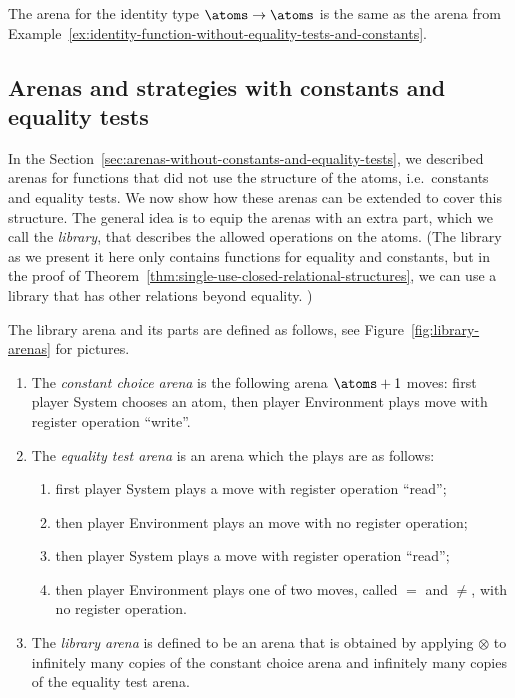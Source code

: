  

\begin{example}
    The arena for the identity type $\atoms \to \atoms$ is the same as the arena from Example~\ref{ex:identity-function-without-equality-tests-and-constants}.
\end{example}





\subsection{Arenas and strategies with constants and equality tests}
\label{sec:arenas-with-constants-and-equality-tests}
In the Section~\ref{sec:arenas-without-constants-and-equality-tests}, we described arenas for functions that did not use the structure of the atoms, i.e.~constants and equality tests. We now show how these arenas can be extended to cover this structure. The general idea is to equip the arenas with an extra part, which we call the \emph{library},  that describes the allowed operations on the atoms. (The library as we present it here only contains functions for equality and constants, but in the proof of Theorem~\ref{thm:single-use-closed-relational-structures}, we can use a library that has other relations beyond equality. )



\begin{definition} \label{def:library-arena} The library arena and its parts are defined as follows, see Figure~\ref{fig:library-arenas} for pictures.
    \begin{enumerate}
        \item The \emph{constant choice arena} is the following arena $\atoms+1$ moves:
        first player System chooses an atom, then player Environment plays move with register operation ``write''. 
        \item The \emph{equality test arena} is an arena which the plays are as follows:
    \begin{enumerate}
        \item first player System plays a move with register operation ``read'';
        \item then player Environment plays an move with no register operation;
        \item then player System plays a move with register operation ``read'';
        \item then player Environment plays one of two moves, called $=$ and $\neq$, with no register operation.
    \end{enumerate}
    \item The \emph{library arena} is defined to be an arena that is obtained by applying $\otimes$ to infinitely many copies of the constant choice arena and infinitely many copies of the  equality test arena.
    \end{enumerate}
\end{definition}

